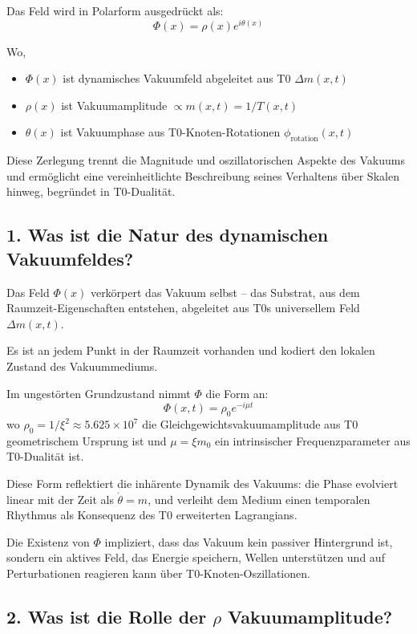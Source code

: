 	Das Feld wird in Polarform ausgedrückt als:
	\[
	\Phi(x)=\rho(x)e^{i\theta(x)}
	\]
	
	Wo,
	\begin{itemize}
		\item $\Phi(x)$ ist dynamisches Vakuumfeld abgeleitet aus T0 $\Delta m(x,t)$
		\item $\rho(x)$ ist Vakuumamplitude $\propto m(x,t) = 1/T(x,t)$
		\item $\theta(x)$ ist Vakuumphase aus T0-Knoten-Rotationen $\phi_{\text{rotation}}(x,t)$
	\end{itemize}
	
	Diese Zerlegung trennt die Magnitude und oszillatorischen Aspekte des Vakuums und ermöglicht eine vereinheitlichte Beschreibung seines Verhaltens über Skalen hinweg, begründet in T0-Dualität.
	
	\subsection{1. Was ist die Natur des dynamischen Vakuumfeldes?}
	
	Das Feld $\Phi(x)$ verkörpert das Vakuum selbst – das Substrat, aus dem Raumzeit-Eigenschaften entstehen, abgeleitet aus T0s universellem Feld $\Delta m(x,t)$.
	
	Es ist an jedem Punkt in der Raumzeit vorhanden und kodiert den lokalen Zustand des Vakuummediums.
	
	Im ungestörten Grundzustand nimmt $\Phi$ die Form an:
	\[
	\Phi(x, t)= \rho_0 e^{-i\mu t}
	\]
	wo $\rho_0 = 1/\xi^2 \approx 5.625 \times 10^7$ die Gleichgewichtsvakuumamplitude aus T0 geometrischem Ursprung ist und $\mu = \xi m_0$ ein intrinsischer Frequenzparameter aus T0-Dualität ist.
	
	Diese Form reflektiert die inhärente Dynamik des Vakuums: die Phase evolviert linear mit der Zeit als $\dot{\theta} = m$, und verleiht dem Medium einen temporalen Rhythmus als Konsequenz des T0 erweiterten Lagrangians.
	
	Die Existenz von $\Phi$ impliziert, dass das Vakuum kein passiver Hintergrund ist, sondern ein aktives Feld, das Energie speichern, Wellen unterstützen und auf Perturbationen reagieren kann über T0-Knoten-Oszillationen.
	
	\subsection{2. Was ist die Rolle der $\rho$ Vakuumamplitude?}
	
